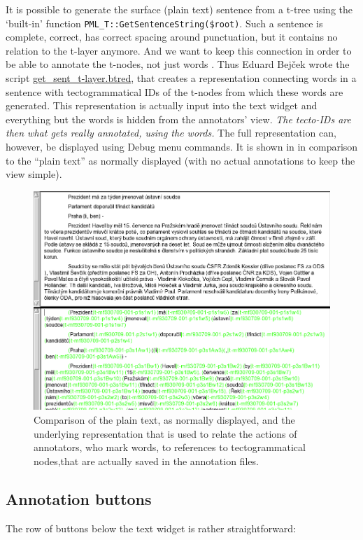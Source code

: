 It is possible to generate the surface (plain text) sentence from a t-tree using the `built-in' function \verb=PML_T::GetSentenceString($root)=. Such a sentence is complete, correct, has correct spacing around punctuation, but it contains no relation to the t-layer anymore. And we want to keep this connection in order to be able to annotate the t-nodes, not just words . Thus Eduard Bejček wrote the script \url{get_sent_t-layer.btred}, that creates a representation connecting words in a sentence with tectogrammatical IDs of the t-nodes from which these words are generated. This representation is actually input into the text widget and everything but the words is hidden from the annotators' view. \emph{The tecto-IDs are then what gets really annotated, \emph{using} the words.} The full representation can, however, be displayed using Debug menu commands. It is shown in  in comparison to the ``plain text'' as normally displayed (with no actual annotations to keep the view simple).

\begin{figure}[htbp]
   \centering
   \includegraphics[width=.95\textwidth]{images/hidden-text}
   \caption{Comparison of the plain text, as normally displayed, and the underlying representation that is used to relate the actions of annotators, who mark words, to references to tectogrammatical nodes,that are actually saved in the annotation files.}
   \label{fig:seman:hidden}
\end{figure}



\subsection{Annotation buttons}
The row of buttons below the text widget is rather straightforward: 

